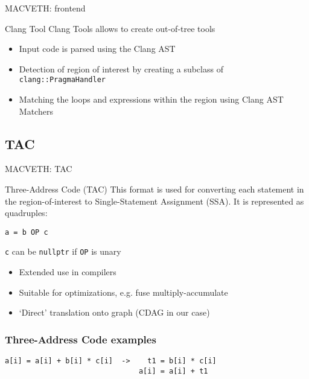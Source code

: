 \documentclass[xcolor=table,hideothersubsections,aspectratio=1610]{beamer}
\begin{document}
\begin{frame}{MACVETH: frontend}
    \begin{block}{Clang Tool}
        Clang Tools allows to create out-of-tree tools
    \end{block}
    \begin{itemize}
        \item Input code is parsed using the Clang AST
        \item Detection of region of interest by creating a subclass of \texttt{clang::PragmaHandler}
        \item Matching the loops and expressions within the region using Clang AST Matchers
    \end{itemize}
\end{frame}


\subsection{TAC}
\begin{frame}{MACVETH: TAC}
    \begin{block}{Three-Address Code (TAC)}
        This format is used for converting each statement in the region-of-interest to Single-Statement Assignment (SSA). It is represented as quadruples:
        \begin{center}
            \texttt{a = b OP c}
        \end{center}
        \texttt{c} can be \texttt{nullptr} if \texttt{OP} is unary
    \end{block}

    \begin{itemize}
        \item Extended use in compilers
        \item Suitable for optimizations, e.g. fuse multiply-accumulate
        \item `Direct' translation onto graph (CDAG in our case)
    \end{itemize}

\end{frame}

\begin{frame}[fragile]
    \frametitle{Three-Address Code examples}

    \begin{verbatim}
a[i] = a[i] + b[i] * c[i]  ->    t1 = b[i] * c[i]
                               a[i] = a[i] + t1
                                
\end{verbatim}

\end{frame}
\end{document}
